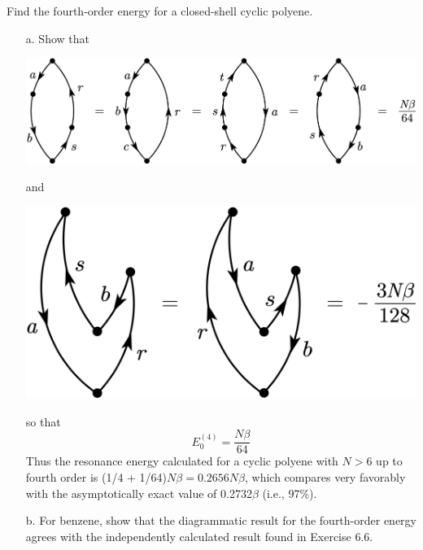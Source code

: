 \documentclass[a4paper]{book}
\newcounter{exercise}[chapter]
\begin{document}
	\begin{exercise}
	Find the fourth-order energy for a closed-shell cyclic polyene.
	\begin{enumerate}
	
	\item[a.] Show that
	
	\begin{center}
	\includegraphics[scale=0.84]{./pictures/6.07/exercise_1.png}
	\end{center}
	
	and
	
	\begin{center}
	\includegraphics[scale=0.84]{./pictures/6.07/exercise_2.png}
	\end{center}
	
	so that
	\[
		E^{(4)}_0 = \frac{N\beta}{64}
	\]
	Thus the resonance energy calculated for a cyclic polyene with $N>6$ up to fourth order is (1/4 + 1/64)$N\beta = 0.2656N\beta$, which compares very favorably with the asymptotically exact value of 0.2732$\beta$ (i.e., 97\%).
	
	\item[b.] For benzene, show that the diagrammatic result for the fourth-order energy agrees with the independently calculated result found in Exercise 6.6.
	
	\end{enumerate}		
	
	\end{exercise}
	
\end{document}

